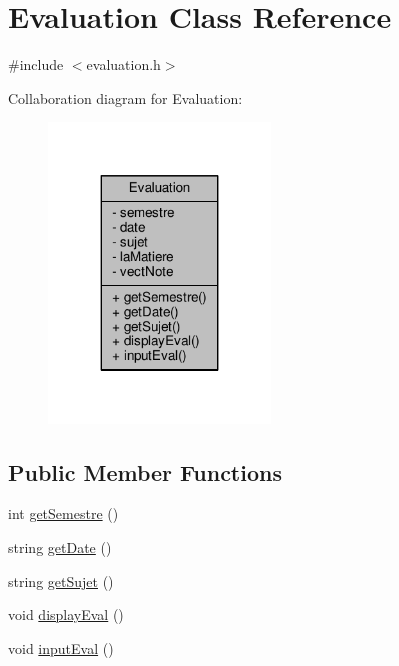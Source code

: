 \hypertarget{class_evaluation}{\section{Evaluation Class Reference}
\label{class_evaluation}
}


{\ttfamily \#include $<$evaluation.\+h$>$}



Collaboration diagram for Evaluation\+:\nopagebreak
\begin{figure}[H]
\begin{center}
\leavevmode
\includegraphics[width=167pt]{class_evaluation__coll__graph}
\end{center}
\end{figure}
\subsection*{Public Member Functions}
\begin{DoxyCompactItemize}
\item 
int \hyperlink{class_evaluation_aa6dd5cebc7176c567c8da59d0e03a552}{get\+Semestre} ()
\item 
string \hyperlink{class_evaluation_a737df75c5f979ec212554209f9224a6e}{get\+Date} ()
\item 
string \hyperlink{class_evaluation_a715aaa51b427078b85a4b68fda0c4baf}{get\+Sujet} ()
\item 
void \hyperlink{class_evaluation_ad2236e7c0ca268589ba9394a179ee532}{display\+Eval} ()
\item 
void \hyperlink{class_evaluation_a76c6aa88b472baae9afbc911a9faf179}{input\+Eval} ()
\end{DoxyCompactItemize}
